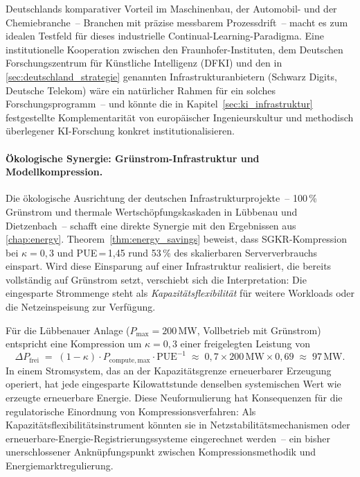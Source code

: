 ﻿\documentclass[12pt, a4paper, openany]{report}
\begin{document}
Deutschlands komparativer Vorteil im Maschinenbau, der Automobil- und
der Chemiebranche~-- Branchen mit präzise messbarem
Prozessdrift~-- macht es zum idealen Testfeld für dieses industrielle
Continual-Learning-Paradigma.  Eine institutionelle Kooperation zwischen
den Fraunhofer-Instituten, dem Deutschen Forschungszentrum für
Künstliche Intelligenz (DFKI) und den in
\cref{sec:deutschland_strategie} genannten Infrastrukturanbietern
(Schwarz Digits, Deutsche Telekom) wäre ein natürlicher Rahmen für ein
solches Forschungsprogramm~-- und könnte die in
Kapitel~\ref{sec:ki_infrastruktur} festgestellte Komplementarität von
europäischer Ingenieurskultur und methodisch überlegener KI-Forschung
konkret institutionalisieren.

\paragraph{Ökologische Synergie: Grünstrom-Infrastruktur und
  Modellkompression.}
Die ökologische Ausrichtung der deutschen Infrastrukturprojekte~--
100\,\% Grünstrom und thermale Wertschöpfungskaskaden in Lübbenau
und Dietzenbach~-- schafft eine direkte Synergie mit den Ergebnissen
aus \cref{chap:energy}.  Theorem~\ref{thm:energy_savings} beweist,
dass SGKR-Kompression bei $\kappa = 0{,}3$ und PUE\,=\,1{,}45 rund
53\,\% des skalierbaren Serververbrauchs einspart.  Wird diese
Einsparung auf einer Infrastruktur realisiert, die bereits vollständig
auf Grünstrom setzt, verschiebt sich die Interpretation: Die eingesparte
Strommenge steht als \emph{Kapazitätsflexibilität} für weitere
Workloads oder die Netzeinspeisung zur Verfügung.

Für die Lübbenauer Anlage ($P_{\mathrm{max}} = 200$\,MW, Vollbetrieb
mit Grünstrom) entspricht eine Kompression um $\kappa = 0{,}3$ einer
freigelegten Leistung von
\[
  \Delta P_{\mathrm{frei}}
  \;=\; (1 - \kappa) \cdot P_{\mathrm{compute,max}} \cdot \mathrm{PUE}^{-1}
  \;\approx\; 0{,}7 \times 200\,\mathrm{MW} \times 0{,}69
  \;\approx\; 97\,\mathrm{MW}.
\]
In einem Stromsystem, das an der Kapazitätsgrenze erneuerbarer Erzeugung
operiert, hat jede eingesparte Kilowattstunde denselben systemischen
Wert wie erzeugte erneuerbare Energie.  Diese Neuformulierung hat
Konsequenzen für die regulatorische Einordnung von
Kompressionsverfahren: Als Kapazitätsflexibilitätsinstrument könnten
sie in Netzstabilitätsmechanismen oder
erneuerbare-Energie-Registrierungssysteme eingerechnet werden~-- ein
bisher unerschlossener Anknüpfungspunkt zwischen Kompressionsmethodik
und Energiemarktregulierung.
\end{document}
